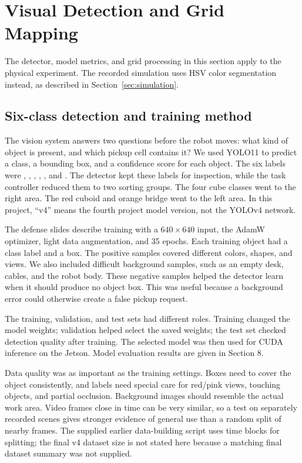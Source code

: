 \clearpage
\section{Visual Detection and Grid Mapping}
The detector, model metrics, and grid processing in this section apply to the physical experiment. The recorded simulation uses HSV color segmentation instead, as described in Section~\ref{sec:simulation}.

\label{sec:vision}

\subsection{Six-class detection and training method}

The vision system answers two questions before the robot moves: what kind of object is present, and which pickup cell contains it? We used YOLO11 to predict a class, a bounding box, and a confidence score for each object. The six labels were , , , , , and . The detector kept these labels for inspection, while the task controller reduced them to two sorting groups. The four cube classes went to the right area. The red cuboid and orange bridge went to the left area. In this project, ``v4'' means the fourth project model version, not the YOLOv4 network.

The defense slides describe training with a $640\times640$ input, the AdamW optimizer, light data augmentation, and 35 epochs. Each training object had a class label and a box. The positive samples covered different colors, shapes, and views. We also included difficult background samples, such as an empty desk, cables, and the robot body. These negative samples helped the detector learn when it should produce no object box. This was useful because a background error could otherwise create a false pickup request.

The training, validation, and test sets had different roles. Training changed the model weights; validation helped select the saved weights; the test set checked detection quality after training. The selected model was then used for CUDA inference on the Jetson. Model evaluation results are given in Section 8.

Data quality was as important as the training settings. Boxes need to cover the object consistently, and labels need special care for red/pink views, touching objects, and partial occlusion. Background images should resemble the actual work area. Video frames close in time can be very similar, so a test on separately recorded scenes gives stronger evidence of general use than a random split of nearby frames. The supplied earlier data-building script uses time blocks for splitting; the final v4 dataset size is not stated here because a matching final dataset summary was not supplied.

